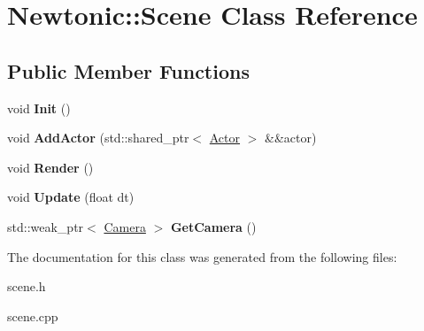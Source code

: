 \hypertarget{classNewtonic_1_1Scene}{}\section{Newtonic\+::Scene Class Reference}
\label{classNewtonic_1_1Scene}
\subsection*{Public Member Functions}
\begin{DoxyCompactItemize}
\item 
\mbox{\label{classNewtonic_1_1Scene_aa03daf5b5c19bd80a947875e3eb93485}} 
void {\bfseries Init} ()
\item 
\mbox{\label{classNewtonic_1_1Scene_a7a34d298cadef414ddd305b4a41db20b}} 
void {\bfseries Add\+Actor} (std\+::shared\+\_\+ptr$<$ \mbox{\hyperlink{classNewtonic_1_1Actor}{Actor}} $>$ \&\&actor)
\item 
\mbox{\label{classNewtonic_1_1Scene_aab2eb7b3d92b2b29caf3840155300512}} 
void {\bfseries Render} ()
\item 
\mbox{\label{classNewtonic_1_1Scene_aac3bd2d40abddd0694029bf1951cc68a}} 
void {\bfseries Update} (float dt)
\item 
\mbox{\label{classNewtonic_1_1Scene_ac7d8348d9c53d1478059a6fa8388a936}} 
std\+::weak\+\_\+ptr$<$ \mbox{\hyperlink{classNewtonic_1_1Camera}{Camera}} $>$ {\bfseries Get\+Camera} ()
\end{DoxyCompactItemize}


The documentation for this class was generated from the following files\+:\begin{DoxyCompactItemize}
\item 
scene.\+h\item 
scene.\+cpp\end{DoxyCompactItemize}
